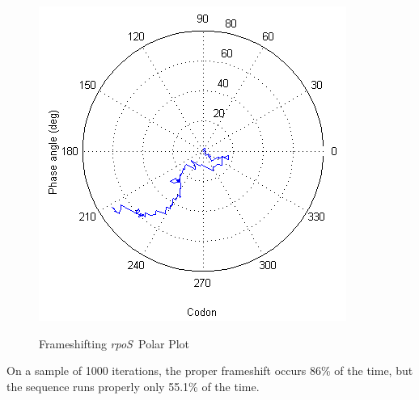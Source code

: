 \documentclass[10pt,twocolumn]{article}
\newcommand{\rpoS}{\emph{rpoS}}
\begin{document}
\begin{figure}[htp]
    \centering
    \caption{Frameshifting \rpoS\ Polar Plot}
    \label{rposfs:polar}
    {\includegraphics[scale=0.7]{rpoSfs_polar.png}}
\end{figure}

On a sample of 1000 iterations, the proper frameshift occurs 86\% of the time, but the sequence runs properly only 55.1\% of the time.
\end{document}
